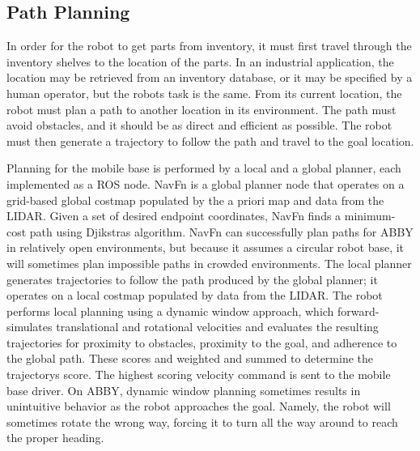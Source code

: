 \documentclass{cwru}
\begin{document}
\subsection[Path Planning]{Path Planning}
In order for the robot to get parts from inventory, it must first travel through the inventory shelves to the location of the parts. In an industrial application, the location may be retrieved from an inventory database, or it may be specified by a human operator, but the robot{\textquotesingle}s task is the same. From its current location, the robot must plan a path to another location in its environment. The path must avoid obstacles, and it should be as direct and efficient as possible. The robot must then generate a trajectory to follow the path and travel to the goal location.

Planning for the mobile base is performed by a local and a global planner, each implemented as a ROS node. NavFn\cite{navfn} is a global planner node that operates on a grid-based global costmap populated by the a priori map and data from the LIDAR. Given a set of desired endpoint coordinates, NavFn finds a minimum-cost path using Djikstra{\textquotesingle}s algorithm\cite{djikstra}. NavFn can successfully plan paths for ABBY in relatively open environments, but because it assumes a circular robot base, it will sometimes plan impossible paths in crowded environments. The local planner generates trajectories to follow the path produced by the global planner; it operates on a local costmap populated by data from the LIDAR. The robot performs local planning using a dynamic window approach,\cite{probabilistic-robotics} which forward-simulates translational and rotational velocities and evaluates the resulting trajectories for proximity to obstacles, proximity to the goal, and adherence to the global path. These scores and weighted and summed to determine the trajectory{\textquotesingle}s score. The highest scoring velocity command is sent to the mobile base driver. On ABBY, dynamic window planning sometimes results in unintuitive behavior as the robot approaches the goal. Namely, the robot will sometimes rotate the wrong way, forcing it to turn all the way around to reach the proper heading.
\end{document}
